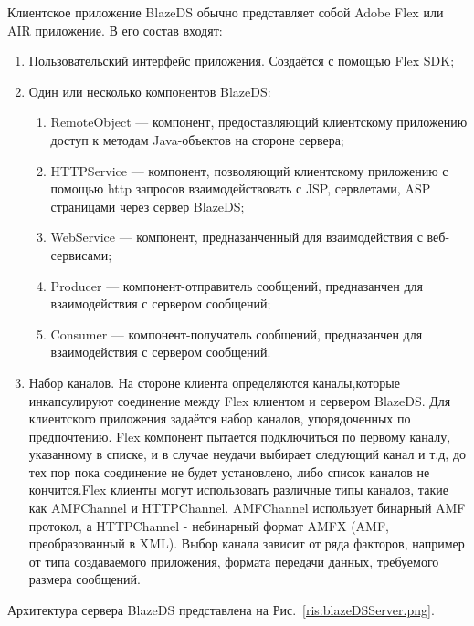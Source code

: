 Клиентское приложение BlazeDS обычно представляет собой Adobe Flex или AIR приложение. В его состав входят: 

\begin{enumerate}
\item Пользовательский интерфейс приложения. Создаётся с помощью Flex SDK;
\item Один или несколько компонентов BlazeDS: 
\begin{enumerate}
\item RemoteObject --- компонент, предоставляющий клиентскому приложению доступ к методам Java-объектов на стороне сервера; 
\item HTTPService --- компонент, позволяющий клиентскому приложению с помощью http запросов взаимодействовать с JSP, сервлетами, 
ASP страницами через сервер BlazeDS;
\item WebService --- компонент, предназанченный для взаимодействия с веб-сервисами;
\item Producer --- компонент-отправитель сообщений, предназанчен для взаимодействия с сервером сообщений;
\item Consumer --- компонент-получатель сообщений, предназанчен для взаимодействия с сервером сообщений.
\end{enumerate}
\item Набор каналов. На стороне клиента определяются каналы,которые инкапсулируют соединение между Flex клиентом и сервером 
BlazeDS. Для клиентского приложения задаётся набор каналов, упорядоченных по предпочтению. Flex компонент пытается подключиться 
по первому каналу, указанному в списке, и в случае неудачи выбирает следующий канал и т.д, до тех пор пока соединение не будет 
установлено, либо список каналов не кончится.Flex клиенты могут использовать различные типы каналов, такие как AMFChannel и 
HTTPChannel. AMFChannel использует бинарный AMF протокол, а HTTPChannel - небинарный формат AMFX (AMF, преобразованный в XML). 
Выбор канала зависит от ряда факторов, например от типа создаваемого приложения, формата передачи данных, требуемого размера 
сообщений.
\end{enumerate}

Архитектура сервера BlazeDS представлена на Рис.~\ref{ris:blazeDSServer.png}.

